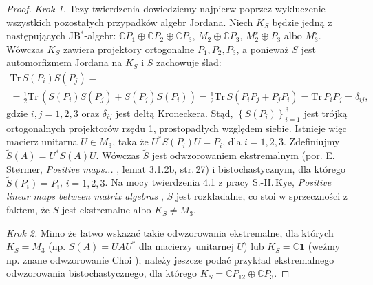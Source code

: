{\begin{proof}
\emph{Krok 1.}
Tezy twierdzenia dowiedziemy najpierw poprzez wykluczenie wszystkich
pozostałych przypadków algebr Jordana.
Niech $K_{S}$ będzie jedną z następujących JB$^{*}$-algebr:
$\mathbb{C} P_{1} \oplus \mathbb{C} P_{2} \oplus \mathbb{C} P_{3}$,
$M_{2} \oplus \mathbb{C} P_{3}$,
$M_{2}^{s} \oplus P_{3}$ albo $M_{3}^{s}$.
Wówczas $K_{S}$ zawiera projektory ortogonalne $P_{1}, P_{2}, P_{3}$,
a ponieważ $S$ jest automorfizmem Jordana na $K_{S}$ i $S$ zachowuje ślad:
\begin{multline}
    \text{Tr} \, S(P_{i}) S(P_{j}) = \\
= \frac{1}{2} \text{Tr} \, \left( S(P_{i}) S(P_{j}) + S(P_{j}) S(P_{i}) \right)=
\frac{1}{2} \text{Tr} \, S(P_{i} P_{j} + P_{j} P_{i})=
\text{Tr} \, P_{i} P_{j} = \delta_{ij},
\end{multline}
gdzie $i,j = 1,2,3$ oraz $\delta_{ij}$ jest deltą Kroneckera.
Stąd, $\left\{S(P_{i})\right\}_{i=1}^{3}$
jest trójką ortogonalnych projektorów rzędu 1, prostopadłych względem siebie.
Istnieje więc macierz unitarna $U \in M_{3}$, taka że
$U^{*} S(P_{i}) U = P_{i}$, dla $i = 1,2,3$.
Zdefiniujmy $\tilde{S}(A) = U^{*} S(A) U$.
Wówczas $\tilde{S}$ jest odwzorowaniem ekstremalnym
(por. E.\,St{\o}rmer, \emph{Positive maps...} \cite{Stormer2013}, lemat 3.1.2b, str.\,27)
i bistochastycznym, dla którego
$\tilde{S}(P_{i}) = P_{i}$, $i = 1,2,3$.
Na mocy twierdzenia 4.1 z pracy
S.-H.\,Kye, \emph{Positive linear maps between matrix algebras}
\cite{kye1995positive},
$\tilde{S}$ jest rozkładalne,
co stoi w sprzeczności z faktem, że $S$ jest ekstremalne albo $K_{S} \neq M_{3}$.

\emph{Krok 2.}
Mimo że łatwo wskazać takie odwzorowania ekstremalne, dla których
$K_{S}=M_{3}$ (np. $S(A) = U A U^{*}$ dla macierzy unitarnej $U$)
lub $K_{S}=\mathbb{C} \mathbf{1}$
(weźmy np. znane odwzorowanie Choi
\cite{choi1977extremal});
należy jeszcze podać przykład ekstremalnego odwzorowania bistochastycznego,
dla którego
$K_{S}= \mathbb{C} P_{12} \oplus \mathbb{C} P_{3}$.


\end{proof}}
